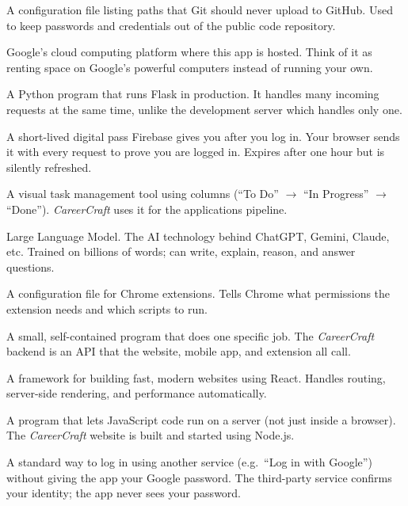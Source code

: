 \documentclass[12pt, a4paper]{report}
\newcommand{\cc}{\textit{CareerCraft}}
\begin{document}
\begin{description}[style=nextline, leftmargin=3cm, labelwidth=2.8cm, font=\bfseries\color{ccpurple}]
\item[Gitignore]
A configuration file listing paths that Git should never upload to GitHub.
Used to keep passwords and credentials out of the public code repository.

\item[Google Cloud]
Google's cloud computing platform where this app is hosted.
Think of it as renting space on Google's powerful computers instead of running your own.

\item[Gunicorn]
A Python program that runs Flask in production.
It handles many incoming requests at the same time, unlike the development server which handles only one.

\item[ID Token]
A short-lived digital pass Firebase gives you after you log in.
Your browser sends it with every request to prove you are logged in.
Expires after one hour but is silently refreshed.

\item[Kanban Board]
A visual task management tool using columns (``To Do'' $\to$ ``In Progress'' $\to$ ``Done'').
\cc{} uses it for the applications pipeline.

\item[LLM]
Large Language Model.
The AI technology behind ChatGPT, Gemini, Claude, etc.
Trained on billions of words; can write, explain, reason, and answer questions.

\item[Manifest.json]
A configuration file for Chrome extensions.
Tells Chrome what permissions the extension needs and which scripts to run.

\item[Microservice / API]
A small, self-contained program that does one specific job.
The \cc{} backend is an API that the website, mobile app, and extension all call.

\item[Next.js]
A framework for building fast, modern websites using React.
Handles routing, server-side rendering, and performance automatically.

\item[Node.js]
A program that lets JavaScript code run on a server (not just inside a browser).
The \cc{} website is built and started using Node.js.

\item[OAuth]
A standard way to log in using another service (e.g.\ ``Log in with Google'')
without giving the app your Google password.
The third-party service confirms your identity; the app never sees your password.


\end{description}
\end{document}
